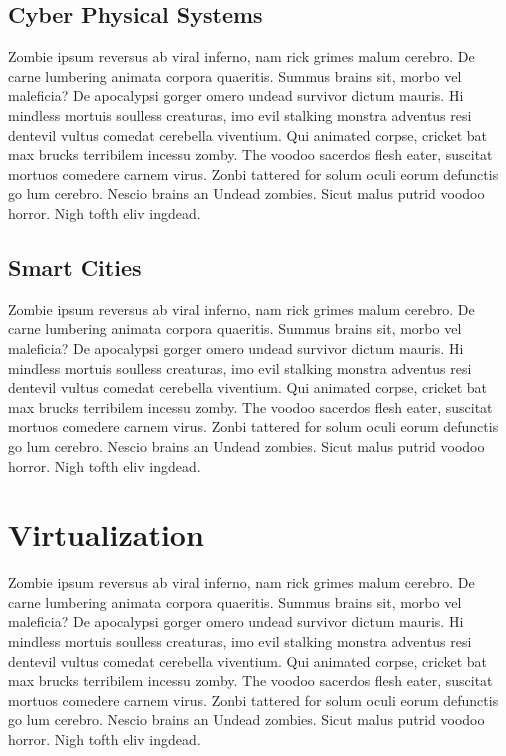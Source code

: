 \subsection{Cyber Physical Systems}
Zombie ipsum reversus ab viral inferno, nam rick grimes malum cerebro.
De carne lumbering animata corpora quaeritis.
Summus brains sit, morbo vel maleficia?
De apocalypsi gorger omero undead survivor dictum mauris. Hi mindless mortuis soulless creaturas, imo evil stalking monstra adventus resi dentevil vultus comedat cerebella viventium.
Qui animated corpse, cricket bat max brucks terribilem incessu zomby.
The voodoo sacerdos flesh eater, suscitat mortuos comedere carnem virus.
Zonbi tattered for solum oculi eorum defunctis go lum cerebro.
Nescio brains an Undead zombies.
Sicut malus putrid voodoo horror.
Nigh tofth eliv ingdead.

\subsection{Smart Cities}
Zombie ipsum reversus ab viral inferno, nam rick grimes malum cerebro.
De carne lumbering animata corpora quaeritis.
Summus brains sit, morbo vel maleficia?
De apocalypsi gorger omero undead survivor dictum mauris. Hi mindless mortuis soulless creaturas, imo evil stalking monstra adventus resi dentevil vultus comedat cerebella viventium.
Qui animated corpse, cricket bat max brucks terribilem incessu zomby.
The voodoo sacerdos flesh eater, suscitat mortuos comedere carnem virus.
Zonbi tattered for solum oculi eorum defunctis go lum cerebro.
Nescio brains an Undead zombies.
Sicut malus putrid voodoo horror.
Nigh tofth eliv ingdead.

\section{Virtualization}
Zombie ipsum reversus ab viral inferno, nam rick grimes malum cerebro.
De carne lumbering animata corpora quaeritis.
Summus brains sit, morbo vel maleficia?
De apocalypsi gorger omero undead survivor dictum mauris. Hi mindless mortuis soulless creaturas, imo evil stalking monstra adventus resi dentevil vultus comedat cerebella viventium.
Qui animated corpse, cricket bat max brucks terribilem incessu zomby.
The voodoo sacerdos flesh eater, suscitat mortuos comedere carnem virus.
Zonbi tattered for solum oculi eorum defunctis go lum cerebro.
Nescio brains an Undead zombies.
Sicut malus putrid voodoo horror.
Nigh tofth eliv ingdead.

